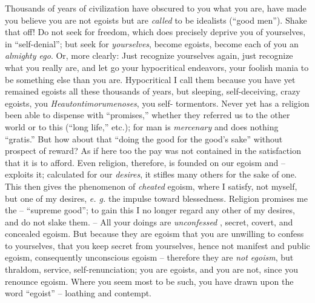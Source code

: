 \documentclass[12pt,a4paper]{book}
\begin{document}
Thousands of years of civilization have obscured to you what you are, have 
made you believe you are not egoists but are \textit{called} to be idealists 
(``good men''). Shake that off! Do not seek for freedom, which does 
precisely deprive you of yourselves, in ``self-denial''; but seek for 
\textit{yourselves}, become egoists, become each of you an \textit{almighty 
ego}. Or, more clearly: Just recognize yourselves again, just recognize what 
you really are, and let go your hypocritical endeavors, your foolish mania to 
be something else than you are. Hypocritical I call them because you have yet 
remained egoists all these thousands of years, but sleeping, self-deceiving, 
crazy egoists, you \textit{Heautontimorumenoses}, you self- tormentors. Never 
yet has a religion been able to dispense with ``promises,'' whether they 
referred us to the other world or to this (``long life,'' etc.); for man is 
\textit{mercenary} and does nothing ``gratis.'' But how about that ``doing 
the good for the good's sake'' without prospect of reward? As if here too the 
pay was not contained in the satisfaction that it is to afford. Even religion, 
therefore, is founded on our egoism and -- exploits it; calculated for our 
\textit{desires}, it stifles many others for the sake of one. This then gives 
the phenomenon of \textit{cheated} egoism, where I satisfy, not myself, but 
one of my desires, \textit{e. g.} the impulse toward blessedness. Religion 
promises me the -- ``supreme good''; to gain this I no longer regard any 
other of my desires, and do not slake them. -- All your doings are 
\textit{unconfessed} , secret, covert, and concealed egoism. But because they 
are egoism that you are unwilling to confess to yourselves, that you keep 
secret from yourselves, hence not manifest and public egoism, consequently 
unconscious egoism -- therefore they are \textit{not egoism}, but thraldom, 
service, self-renunciation; you are egoists, and you are not, since you 
renounce egoism. Where you seem most to be such, you have drawn upon the word 
``egoist'' -- loathing and contempt.
\end{document}
